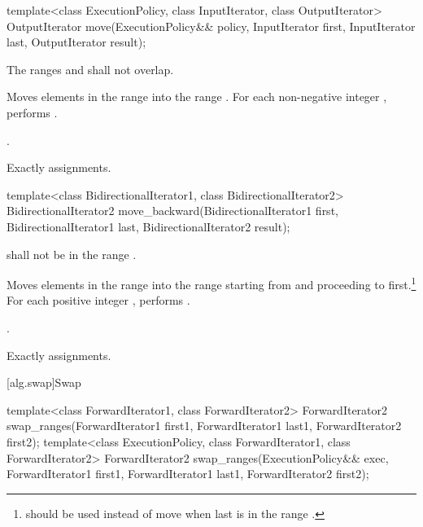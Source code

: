 %
\begin{itemdecl}
template<class ExecutionPolicy, class InputIterator, class OutputIterator>
  OutputIterator move(ExecutionPolicy&& policy, InputIterator first, InputIterator last,
                      OutputIterator result);
\end{itemdecl}

\begin{itemdescr}
\pnum
\requires The ranges  and
 shall not overlap.

\pnum
\effects Moves elements in the range  into
the range .
For each non-negative integer ,
performs .

\pnum
\returns {}.

\pnum
\complexity Exactly  assignments.
\end{itemdescr}

%
\begin{itemdecl}
template<class BidirectionalIterator1, class BidirectionalIterator2>
  BidirectionalIterator2
    move_backward(BidirectionalIterator1 first,
                  BidirectionalIterator1 last,
                  BidirectionalIterator2 result);
\end{itemdecl}


\begin{itemdescr}
\pnum
\requires
{}
shall not be in the range
.

\pnum
\effects
Moves elements in the range 
into the
range 
starting from
and proceeding to first.\footnote{
should be used instead of move when last
is in
the range
.}
For each positive integer
,
performs
.

\pnum
\returns
{}.

\pnum
\complexity
Exactly
assignments.
\end{itemdescr}

[alg.swap]{Swap}

%
\begin{itemdecl}
template<class ForwardIterator1, class ForwardIterator2>
  ForwardIterator2
    swap_ranges(ForwardIterator1 first1, ForwardIterator1 last1,
                ForwardIterator2 first2);
template<class ExecutionPolicy, class ForwardIterator1, class ForwardIterator2>
  ForwardIterator2
    swap_ranges(ExecutionPolicy&& exec,
                ForwardIterator1 first1, ForwardIterator1 last1,
                ForwardIterator2 first2);
\end{itemdecl}


